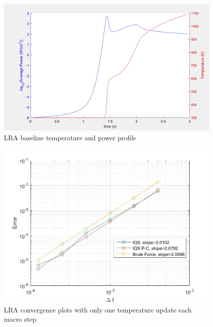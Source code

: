 \documentclass{anstrans}
\begin{document}
\begin{figure}[htbp!]
\includegraphics[width=\linewidth]{lra_profile.png}
\caption{LRA baseline temperature and power profile}
\label{fig:lra_profile}
\end{figure}

\begin{table}[!htbp]
\begin{center}
\end{center}
\caption{LRA baseline verification}
\label{tab:base}
\end{table}

\begin{figure}[!htpb]
\includegraphics[width=\linewidth]{lra_bad.jpg}
\caption{LRA convergence plots with only one temperature update each macro step}
\label{fig:lra_bad}
\end{figure}
\end{document}
